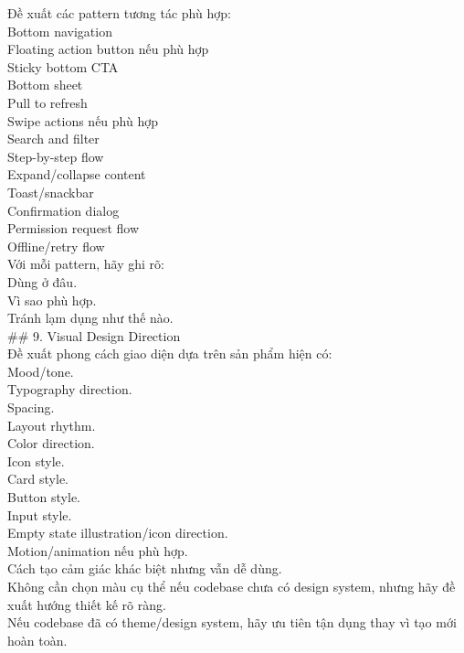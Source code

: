 \begin{enumerate}
Đề xuất các pattern tương tác phù hợp: \\
\* Bottom navigation \\
\* Floating action button nếu phù hợp \\
\* Sticky bottom CTA \\
\* Bottom sheet \\
\* Pull to refresh \\
\* Swipe actions nếu phù hợp \\
\* Search and filter \\
\* Step-by-step flow \\
\* Expand/collapse content \\
\* Toast/snackbar \\
\* Confirmation dialog \\
\* Permission request flow \\
\* Offline/retry flow \\


Với mỗi pattern, hãy ghi rõ: \\
\* Dùng ở đâu. \\
\* Vì sao phù hợp. \\
\* Tránh lạm dụng như thế nào. \\


\#\# 9. Visual Design Direction \\

Đề xuất phong cách giao diện dựa trên sản phẩm hiện có: \\
\* Mood/tone. \\
\* Typography direction. \\
\* Spacing. \\
\* Layout rhythm. \\
\* Color direction. \\
\* Icon style. \\
\* Card style. \\
\* Button style. \\
\* Input style. \\
\* Empty state illustration/icon direction. \\
\* Motion/animation nếu phù hợp. \\
\* Cách tạo cảm giác khác biệt nhưng vẫn dễ dùng. \\


Không cần chọn màu cụ thể nếu codebase chưa có design system, nhưng hãy đề xuất hướng thiết kế rõ ràng. \\

Nếu codebase đã có theme/design system, hãy ưu tiên tận dụng thay vì tạo mới hoàn toàn. \\


\end{enumerate}
